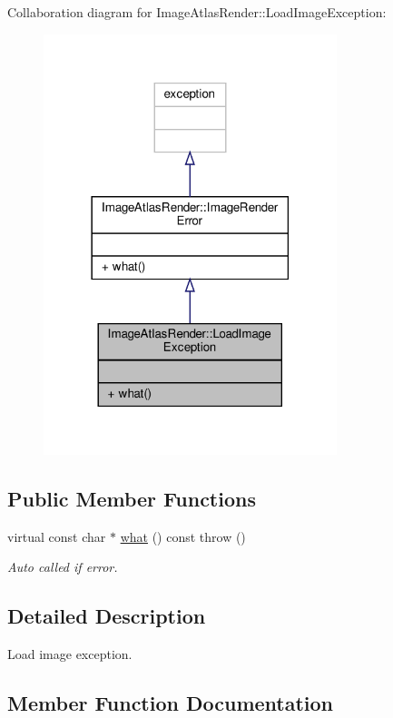 Collaboration diagram for Image\+Atlas\+Render\+:\+:Load\+Image\+Exception\+:
\nopagebreak
\begin{figure}[H]
\begin{center}
\leavevmode
\includegraphics[width=242pt]{class_image_atlas_render_1_1_load_image_exception__coll__graph}
\end{center}
\end{figure}
\subsection*{Public Member Functions}
\begin{DoxyCompactItemize}
\item 
virtual const char $\ast$ \hyperlink{class_image_atlas_render_1_1_load_image_exception_a1ee59c2d803a898aca5004227916c90c}{what} () const  throw ()
\begin{DoxyCompactList}\small\item\em Auto called if error. \end{DoxyCompactList}\end{DoxyCompactItemize}


\subsection{Detailed Description}
Load image exception. 

\subsection{Member Function Documentation}
\mbox{\label{class_image_atlas_render_1_1_load_image_exception_a1ee59c2d803a898aca5004227916c90c}} 
